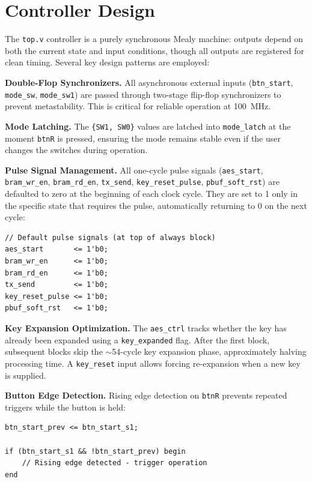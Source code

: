 \documentclass[12pt,a4paper]{article}
\begin{document}
\section{Controller Design}

The \texttt{top.v} controller is a purely synchronous Mealy machine: outputs depend on both the current state and input conditions, though all outputs are registered for clean timing. Several key design patterns are employed:

\textbf{Double-Flop Synchronizers.} All asynchronous external inputs (\texttt{btn\_start}, \texttt{mode\_sw}, \texttt{mode\_sw1}) are passed through two-stage flip-flop synchronizers to prevent metastability. This is critical for reliable operation at 100~MHz.

\textbf{Mode Latching.} The \texttt{\{SW1, SW0\}} values are latched into \texttt{mode\_latch} at the moment \texttt{btnR} is pressed, ensuring the mode remains stable even if the user changes the switches during operation.

\textbf{Pulse Signal Management.} All one-cycle pulse signals (\texttt{aes\_start}, \texttt{bram\_wr\_en}, \texttt{bram\_rd\_en}, \texttt{tx\_send}, \texttt{key\_reset\_pulse}, \texttt{pbuf\_soft\_rst}) are defaulted to zero at the beginning of each clock cycle. They are set to 1 only in the specific state that requires the pulse, automatically returning to 0 on the next cycle:

\begin{lstlisting}
// Default pulse signals (at top of always block)
aes_start       <= 1'b0;
bram_wr_en      <= 1'b0;
bram_rd_en      <= 1'b0;
tx_send         <= 1'b0;
key_reset_pulse <= 1'b0;
pbuf_soft_rst   <= 1'b0;
\end{lstlisting}

\textbf{Key Expansion Optimization.} The \texttt{aes\_ctrl} tracks whether the key has already been expanded using a \texttt{key\_expanded} flag. After the first block, subsequent blocks skip the $\sim$54-cycle key expansion phase, approximately halving processing time. A \texttt{key\_reset} input allows forcing re-expansion when a new key is supplied.

\textbf{Button Edge Detection.} Rising edge detection on \texttt{btnR} prevents repeated triggers while the button is held:

\begin{lstlisting}
btn_start_prev <= btn_start_s1;

if (btn_start_s1 && !btn_start_prev) begin
    // Rising edge detected - trigger operation
end
\end{lstlisting}
\end{document}
